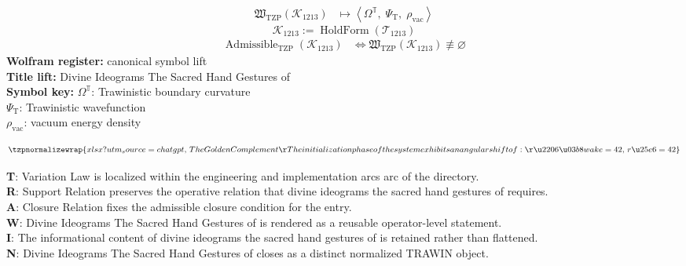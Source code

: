 \noindent
\begin{minipage}[t]{0.48\linewidth}
\begingroup
\small
\[
\begin{aligned}
\mathfrak{W}_{\mathrm{TZP}}\!\left(\mathcal{K}_{1213}\right)
&\longmapsto
\left\langle \Omega^{\mathbb{T}},\; \Psi_{\mathrm{T}},\; \rho_{\mathrm{vac}} \right\rangle
\end{aligned}
\]
\[
\mathcal{K}_{1213}
:=
\operatorname{HoldForm}\!\left(\mathcal{T}_{1213}\right)
\]
\[
\begin{aligned}
\operatorname{Admissible}_{\mathrm{TZP}}\!\left(\mathcal{K}_{1213}\right)
&\Longleftrightarrow
\mathfrak{W}_{\mathrm{TZP}}\!\left(\mathcal{K}_{1213}\right)\not\equiv\varnothing
\end{aligned}
\]
\textbf{Wolfram register:} canonical symbol lift\\
\textbf{Title lift:} Divine Ideograms The Sacred Hand Gestures of\\
\textbf{Symbol key:} \(\Omega^{\mathbb{T}}\): Trawinistic boundary curvature\\ \(\Psi_{\mathrm{T}}\): Trawinistic wavefunction\\ \(\rho_{\mathrm{vac}}\): vacuum energy density
\par
\endgroup
\end{minipage}\hfill
\begin{minipage}[t]{0.48\linewidth}
\[
\tzpnormalizewrap{xlsx?utm_source=chatgpt,\,The Golden Complement\r The initialization phase of the system exhibits an angular shift of:\r \u2206\u03b8wake = 42,\,r \u25e6 = 42}
\]

\small
\textbf{T}: Variation Law is localized within the engineering and implementation arcs arc of the directory.\\
\textbf{R}: Support Relation preserves the operative relation that divine ideograms the sacred hand gestures of requires.\\
\textbf{A}: Closure Relation fixes the admissible closure condition for the entry.\\
\textbf{W}: Divine Ideograms The Sacred Hand Gestures of is rendered as a reusable operator-level statement.\\
\textbf{I}: The informational content of divine ideograms the sacred hand gestures of is retained rather than flattened.\\
\textbf{N}: Divine Ideograms The Sacred Hand Gestures of closes as a distinct normalized TRAWIN object.
\normalsize
\end{minipage}

